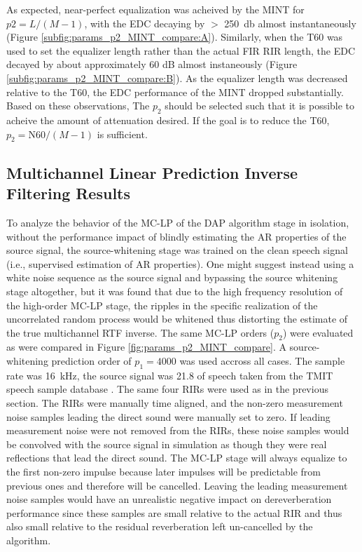 As expected, near-perfect equalization was acheived by the MINT for $p2 = L / \left(M-1\right)$, with the EDC decaying by $>$ \qty{250}{\decibel} almost instantaneously (Figure \ref{subfig:params_p2_MINT_compare:A}). Similarly, when the T60 was used to set the equalizer length rather than the actual FIR RIR length, the EDC decayed by about approximately 60 dB almost instaneously (Figure \ref{subfig:params_p2_MINT_compare:B}). As the equalizer length was decreased relative to the T60, the EDC performance of the MINT dropped substantially. Based on these observations, The $p_2$ should be selected such that it is possible to acheive the amount of attenuation desired. If the goal is to reduce the T60, $p_2 = \mathrm{N60}  / \left(M-1 \right)$ is sufficient.

\subsection{Multichannel Linear Prediction Inverse Filtering Results} \label{section:params_p2_MC_LP} 

To analyze the behavior of the MC-LP of the DAP algorithm stage in isolation, without the performance impact of blindly estimating the AR properties of the source signal, the source-whitening stage was trained on the clean speech signal (i.e., supervised estimation of AR properties). One might suggest instead using a white noise sequence as the source signal and bypassing the source whitening stage altogether, but it was found that due to the high frequency resolution of the high-order MC-LP stage, the ripples in the specific realization of the uncorrelated random process would be whitened thus distorting the estimate of the true multichannel RTF inverse. The same MC-LP orders ($p_2$) were evaluated as were compared in Figure \ref{fig:params_p2_MINT_compare}. A source-whitening prediction order of $p_1 = 4000$ was used accross all cases. The sample rate was \qty{16}{\kilo\hertz}, the source signal was \qty{21.8}{\sec} of speech taken from the TMIT speech sample database \citep{garofolo1993timit}. The same four RIRs were used as in the previous section. The RIRs were manually time aligned, and the non-zero measurement noise samples leading the direct sound were manually set to zero. If leading measurement noise were not removed from the RIRs, these noise samples would be convolved with the source signal in simulation as though they were real reflections that lead the direct sound. The MC-LP stage will always equalize to the first non-zero impulse because later impulses will be predictable from previous ones and therefore will be cancelled. Leaving the leading measurement noise samples would have an unrealistic negative impact on dereverberation performance since these samples are small relative to the actual RIR and thus also small relative to the residual reverberation left un-cancelled by the algorithm.

